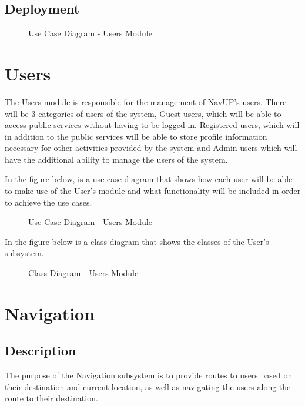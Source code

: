 \documentclass[english]{article}
\begin{document}
	   \subsection{Deployment}
	        \begin{figure}[H]
            \centering	            \centerline{}
            \caption{Use Case Diagram - Users Module}
        \end{figure}

	\section{Users}
	    The Users module is responsible for the management of NavUP's users. There will be 3 categories of users of the system, Guest users, which will be able to access public services without having to be logged in. Registered users, which will in addition to the public services will be able to store profile information necessary for other activities provided by the system and Admin users which will have the additional ability to manage the users of the system.
		
		In the figure below, is a use case diagram that shows how each user will be able to make use of the User's module and what functionality will be included in order to achieve the use cases.
		\begin{figure}[H]
            \centering	            \centerline{}
            \caption{Use Case Diagram - Users Module}
        \end{figure}
		
		In the figure below is a class diagram that shows the classes of the User's subsystem.
	    \begin{figure}[H]
            \centering	            \centerline{}
            \caption{Class Diagram - Users Module}
        \end{figure}

	\section{Navigation}
        \subsection{Description}
            The purpose of the Navigation subsystem is to provide routes to users based on their destination and current location, as well as navigating the users along the route to their destination.\\
\end{document}
